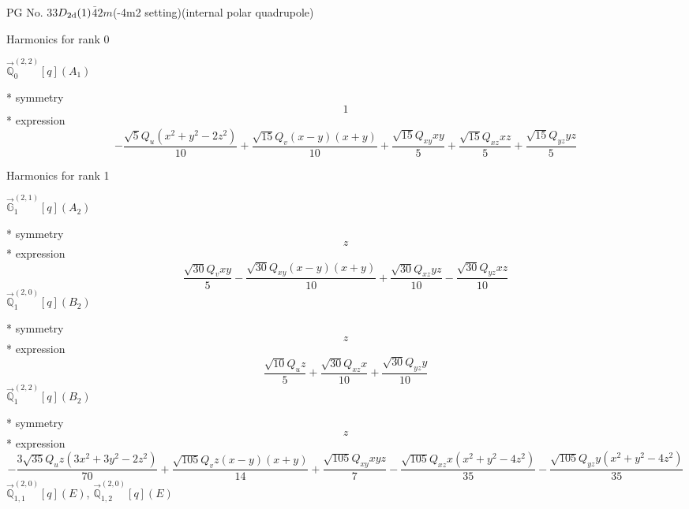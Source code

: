 \documentclass[fleqn,8pt]{jsarticle}
\begin{document}
\setcounter{MaxMatrixCols}{32}

\renewcommand{\tablename}{Table~}
\renewcommand{\figurename}{Figure~}
\begin{center}
\LARGE
PG No. 33\quad$D_{\rm 2d}(1)$\quad$\bar{4}2m$\quad(-4m2 setting)\quad[ tetragonal ] (internal polar quadrupole)
\end{center}

\noindent * Harmonics for rank 0

\noindent\quad $\vec{\mathbb{Q}}_{0}^{(2,2)}[q](A_{1})$

\noindent\quad ** symmetry
\begin{dmath*}
1
\end{dmath*}
\noindent\quad ** expression
\begin{dmath*}
- \frac{\sqrt{5} Q_{u} \left(x^{2} + y^{2} - 2 z^{2}\right)}{10} + \frac{\sqrt{15} Q_{v} \left(x - y\right) \left(x + y\right)}{10} + \frac{\sqrt{15} Q_{xy} x y}{5} + \frac{\sqrt{15} Q_{xz} x z}{5} + \frac{\sqrt{15} Q_{yz} y z}{5}
\end{dmath*}

\noindent * Harmonics for rank 1

\noindent\quad $\vec{\mathbb{G}}_{1}^{(2,1)}[q](A_{2})$

\noindent\quad ** symmetry
\begin{dmath*}
z
\end{dmath*}
\noindent\quad ** expression
\begin{dmath*}
\frac{\sqrt{30} Q_{v} x y}{5} - \frac{\sqrt{30} Q_{xy} \left(x - y\right) \left(x + y\right)}{10} + \frac{\sqrt{30} Q_{xz} y z}{10} - \frac{\sqrt{30} Q_{yz} x z}{10}
\end{dmath*}
\noindent\quad $\vec{\mathbb{Q}}_{1}^{(2,0)}[q](B_{2})$

\noindent\quad ** symmetry
\begin{dmath*}
z
\end{dmath*}
\noindent\quad ** expression
\begin{dmath*}
\frac{\sqrt{10} Q_{u} z}{5} + \frac{\sqrt{30} Q_{xz} x}{10} + \frac{\sqrt{30} Q_{yz} y}{10}
\end{dmath*}
\noindent\quad $\vec{\mathbb{Q}}_{1}^{(2,2)}[q](B_{2})$

\noindent\quad ** symmetry
\begin{dmath*}
z
\end{dmath*}
\noindent\quad ** expression
\begin{dmath*}
- \frac{3 \sqrt{35} Q_{u} z \left(3 x^{2} + 3 y^{2} - 2 z^{2}\right)}{70} + \frac{\sqrt{105} Q_{v} z \left(x - y\right) \left(x + y\right)}{14} + \frac{\sqrt{105} Q_{xy} x y z}{7} - \frac{\sqrt{105} Q_{xz} x \left(x^{2} + y^{2} - 4 z^{2}\right)}{35} - \frac{\sqrt{105} Q_{yz} y \left(x^{2} + y^{2} - 4 z^{2}\right)}{35}
\end{dmath*}
\noindent\quad $\vec{\mathbb{Q}}_{1,1}^{(2,0)}[q](E)$, $\vec{\mathbb{Q}}_{1,2}^{(2,0)}[q](E)$
\end{document}
